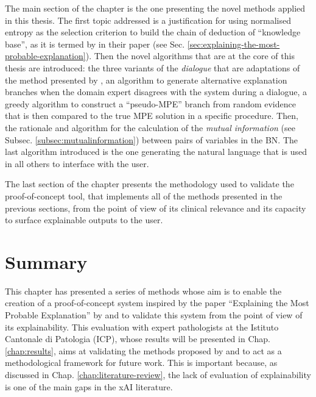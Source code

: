 \documentclass[mscthesis]{usiinfthesis}
\begin{document}
 The main section of the chapter is the one presenting the novel methods applied in this thesis.
 The first topic addressed is a justification for using normalised entropy as the selection criterion to build the chain of deduction of \enquote{knowledge base}, as it is termed by \cite{Butz2018} in their paper (see Sec. \ref{sec:explaining-the-most-probable-explanation}).
 Then the novel algorithms that are at the core of this thesis are introduced: the three variants of the \textit{dialogue} that are adaptations of the method presented by \cite{Butz2018}, an algorithm to generate alternative explanation branches when the domain expert disagrees with the system during a dialogue, a greedy algorithm to construct a \enquote{pseudo-MPE} branch from random evidence that is then compared to the true MPE solution in a specific procedure.
Then, the rationale and algorithm for the calculation of the \textit{mutual information} (see Subsec. \ref{subsec:mutualinformation}) between pairs of variables in the BN.
 The last algorithm introduced is the one generating the natural language that is used in all others to interface with the user.
 
 The last section of the chapter presents the methodology used to validate the proof-of-concept tool, that implements all of the methods presented in the previous sections, from the point of view of its clinical relevance and its capacity to surface explainable outputs to the user.
 





\section{Summary}
This chapter has presented a series of methods whose aim is to enable the creation of a proof-of-concept system inspired by the paper \enquote{Explaining the Most Probable Explanation} by \cite{Butz2018} and to validate this system from the point of view of its explainability.
This evaluation with expert pathologists at the Istituto Cantonale di Patologia (ICP), whose results will be presented in Chap. \ref{chap:results}, aims at validating the methods proposed by \cite{Butz2018} and to act as a methodological framework for future work.
This is important because, as discussed in Chap. \ref{chap:literature-review}, the lack of evaluation of explainability is one of the main gaps in the xAI literature.
\end{document}
